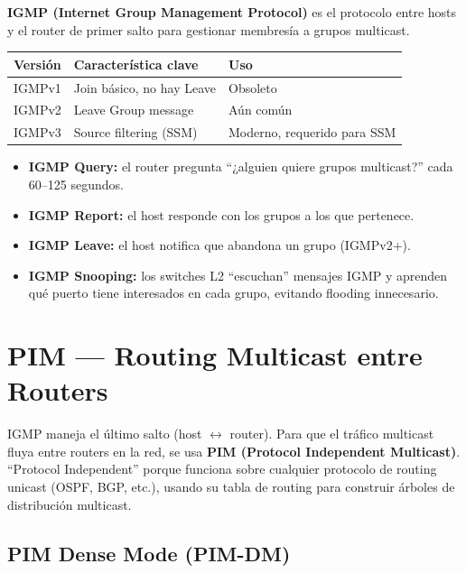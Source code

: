 \begin{concepto}
\textbf{IGMP (Internet Group Management Protocol)} es el protocolo entre hosts y el
router de primer salto para gestionar membresía a grupos multicast.
\end{concepto}

\begin{center}
\begin{tabular}{lll}
\toprule
\textbf{Versión} & \textbf{Característica clave} & \textbf{Uso} \\
\midrule
IGMPv1 & Join básico, no hay Leave & Obsoleto \\
IGMPv2 & Leave Group message      & Aún común \\
IGMPv3 & Source filtering (SSM)   & Moderno, requerido para SSM \\
\bottomrule
\end{tabular}
\end{center}

\begin{itemize}
    \item \textbf{IGMP Query:} el router pregunta ``¿alguien quiere grupos multicast?''
          cada 60--125 segundos.
    \item \textbf{IGMP Report:} el host responde con los grupos a los que pertenece.
    \item \textbf{IGMP Leave:} el host notifica que abandona un grupo (IGMPv2+).
    \item \textbf{IGMP Snooping:} los switches L2 ``escuchan'' mensajes IGMP y aprenden
          qué puerto tiene interesados en cada grupo, evitando flooding innecesario.
\end{itemize}

\section{ PIM --- Routing Multicast entre Routers}

\begin{concepto}
IGMP maneja el último salto (host $\leftrightarrow$ router). Para que el tráfico
multicast fluya entre routers en la red, se usa \textbf{PIM (Protocol Independent
Multicast)}. ``Protocol Independent'' porque funciona sobre cualquier protocolo de
routing unicast (OSPF, BGP, etc.), usando su tabla de routing para construir árboles
de distribución multicast.
\end{concepto}

\subsection{PIM Dense Mode (PIM-DM)}

